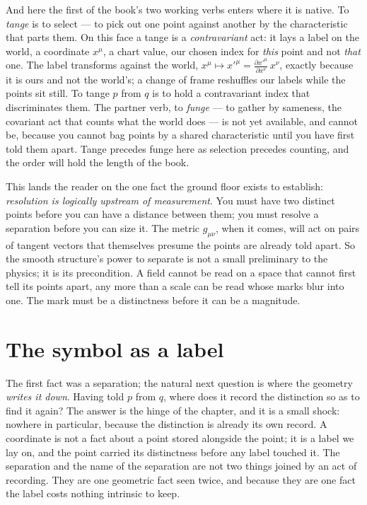 And here the first of the book's two working verbs enters where it is native. To \emph{tange} is to select --- to pick out
one point against another by the characteristic that parts them. On this face a tange is a \emph{contravariant} act: it lays
a label on the world, a coordinate $x^\mu$, a chart value, our chosen index for \emph{this} point and not \emph{that} one.
The label transforms against the world, $x^\mu \mapsto x'^\mu = \frac{\partial x'^\mu}{\partial x^\nu}\,x^\nu$, exactly
because it is ours and not the world's; a change of frame reshuffles our labels while the points sit still. To tange $p$
from $q$ is to hold a contravariant index that discriminates them. The partner verb, to \emph{funge} --- to gather by
sameness, the covariant act that counts what the world does --- is not yet available, and cannot be, because you cannot bag
points by a shared characteristic until you have first told them apart. Tange precedes funge here as selection precedes
counting, and the order will hold the length of the book.

This lands the reader on the one fact the ground floor exists to establish: \emph{resolution is logically upstream of
measurement}. You must have two distinct points before you can have a distance between them; you must resolve a separation
before you can size it. The metric $g_{\mu\nu}$, when it comes, will act on pairs of tangent vectors that themselves presume
the points are already told apart. So the smooth structure's power to separate is not a small preliminary to the physics; it
is its precondition. A field cannot be read on a space that cannot first tell its points apart, any more than a scale can be
read whose marks blur into one. The mark must be a distinctness before it can be a magnitude.

\section{The symbol as a label}

The first fact was a separation; the natural next question is where the geometry \emph{writes it down}. Having told $p$ from
$q$, where does it record the distinction so as to find it again? The answer is the hinge of the chapter, and it is a small
shock: nowhere in particular, because the distinction is already its own record. A coordinate is not a fact about a point
stored alongside the point; it is a label we lay on, and the point carried its distinctness before any label touched it. The
separation and the name of the separation are not two things joined by an act of recording. They are one geometric fact seen
twice, and because they are one fact the label costs nothing intrinsic to keep.

